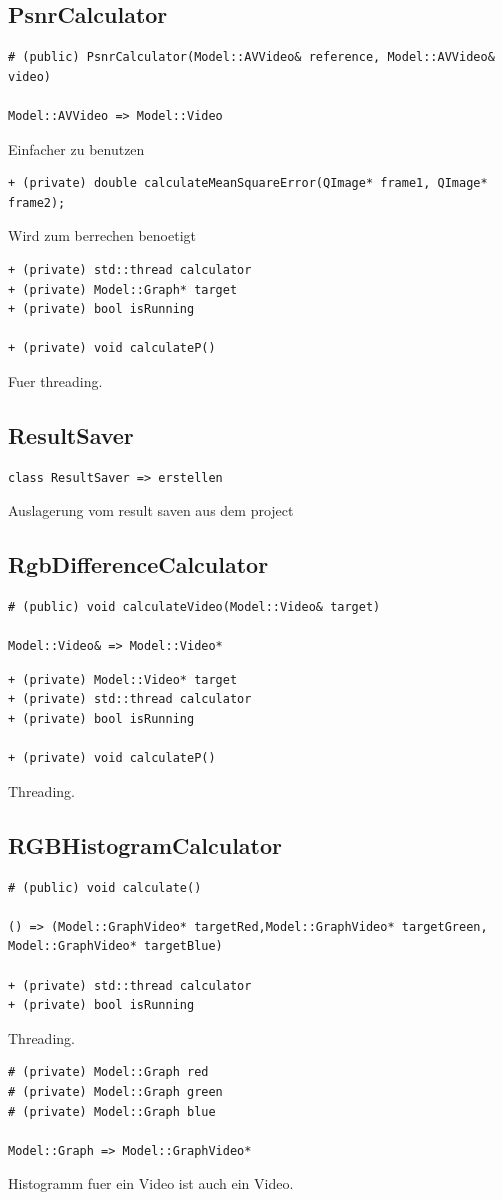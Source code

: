 \documentclass[parskip=full]{scrartcl}
\begin{document}
\subsection{PsnrCalculator}
\begin{verbatim}
# (public) PsnrCalculator(Model::AVVideo& reference, Model::AVVideo& video)

Model::AVVideo => Model::Video
\end{verbatim}
Einfacher zu benutzen
\begin{verbatim}
+ (private) double calculateMeanSquareError(QImage* frame1, QImage* frame2);
\end{verbatim}
Wird zum berrechen benoetigt
\begin{verbatim}
+ (private) std::thread calculator
+ (private) Model::Graph* target
+ (private) bool isRunning

+ (private) void calculateP()
\end{verbatim}
Fuer threading.
\subsection{ResultSaver}
\begin{verbatim}
class ResultSaver => erstellen
\end{verbatim}
Auslagerung vom result saven aus dem project
\subsection{RgbDifferenceCalculator}
\begin{verbatim}
# (public) void calculateVideo(Model::Video& target)

Model::Video& => Model::Video*
\end{verbatim}
\begin{verbatim}
+ (private) Model::Video* target
+ (private) std::thread calculator
+ (private) bool isRunning

+ (private) void calculateP()
\end{verbatim}
Threading.
\subsection{RGBHistogramCalculator}
\begin{verbatim}
# (public) void calculate()

() => (Model::GraphVideo* targetRed,Model::GraphVideo* targetGreen, Model::GraphVideo* targetBlue)

+ (private) std::thread calculator
+ (private) bool isRunning
\end{verbatim}
Threading.
\begin{verbatim}
# (private) Model::Graph red
# (private) Model::Graph green
# (private) Model::Graph blue

Model::Graph => Model::GraphVideo*
\end{verbatim}
Histogramm fuer ein Video ist auch ein Video.
\end{document}
